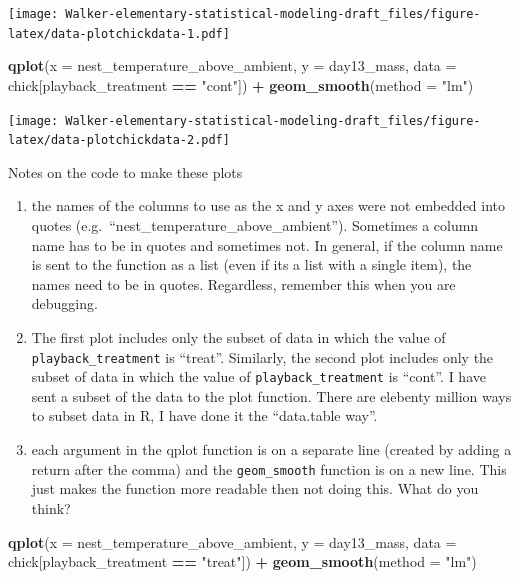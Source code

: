 \documentclass[]{book}
\newenvironment{Shaded}{\begin{snugshade}}{\end{snugshade}}
\newcommand{\DataTypeTok}[1]{\textcolor[rgb]{0.13,0.29,0.53}{#1}}
\newcommand{\KeywordTok}[1]{\textcolor[rgb]{0.13,0.29,0.53}{\textbf{#1}}}
\newcommand{\NormalTok}[1]{#1}
\newcommand{\OperatorTok}[1]{\textcolor[rgb]{0.81,0.36,0.00}{\textbf{#1}}}
\newcommand{\StringTok}[1]{\textcolor[rgb]{0.31,0.60,0.02}{#1}}
\providecommand{\tightlist}{%
  \setlength{\itemsep}{0pt}\setlength{\parskip}{0pt}}
\begin{document}
\texttt{[image: Walker-elementary-statistical-modeling-draft\_files/figure-latex/data-plotchickdata-1.pdf]}

\begin{Shaded}
\begin{Highlighting}[]
\KeywordTok{qplot}\NormalTok{(}\DataTypeTok{x =}\NormalTok{ nest_temperature_above_ambient,}
      \DataTypeTok{y =}\NormalTok{ day13_mass,}
      \DataTypeTok{data =}\NormalTok{ chick[playback_treatment }\OperatorTok{==}\StringTok{ "cont"}\NormalTok{]) }\OperatorTok{+}
\StringTok{  }\KeywordTok{geom_smooth}\NormalTok{(}\DataTypeTok{method =} \StringTok{"lm"}\NormalTok{)}
\end{Highlighting}
\end{Shaded}

\texttt{[image: Walker-elementary-statistical-modeling-draft\_files/figure-latex/data-plotchickdata-2.pdf]}

Notes on the code to make these plots

\begin{enumerate}
\def\labelenumi{\arabic{enumi}.}
\tightlist
\item
  the names of the columns to use as the x and y axes were not embedded into quotes (e.g.~``nest\_temperature\_above\_ambient''). Sometimes a column name has to be in quotes and sometimes not. In general, if the column name is sent to the function as a list (even if its a list with a single item), the names need to be in quotes. Regardless, remember this when you are debugging.
\item
  The first plot includes only the subset of data in which the value of \texttt{playback\_treatment} is ``treat''. Similarly, the second plot includes only the subset of data in which the value of \texttt{playback\_treatment} is ``cont''. I have sent a subset of the data to the plot function. There are elebenty million ways to subset data in R, I have done it the ``data.table way''.
\item
  each argument in the qplot function is on a separate line (created by adding a return after the comma) and the \texttt{geom\_smooth} function is on a new line. This just makes the function more readable then not doing this. What do you think?
\end{enumerate}

\begin{Shaded}
\begin{Highlighting}[]
\KeywordTok{qplot}\NormalTok{(}\DataTypeTok{x =}\NormalTok{ nest_temperature_above_ambient, }\DataTypeTok{y =}\NormalTok{ day13_mass, }\DataTypeTok{data =}\NormalTok{ chick[playback_treatment }\OperatorTok{==}\StringTok{ "treat"}\NormalTok{]) }\OperatorTok{+}\StringTok{ }\KeywordTok{geom_smooth}\NormalTok{(}\DataTypeTok{method =} \StringTok{"lm"}\NormalTok{)}
\end{Highlighting}
\end{Shaded}
\end{document}
